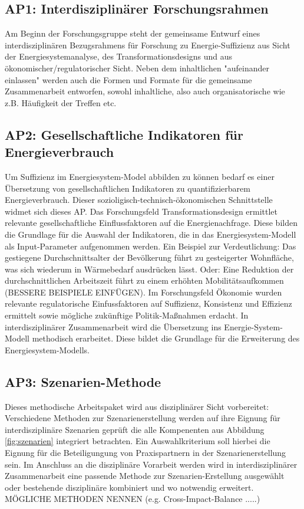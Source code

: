 \documentclass[a4paper,11pt,twoside]{scrartcl}
\begin{document}
\subsection*{AP1: Interdisziplinärer Forschungsrahmen}
Am Beginn der Forschungsgruppe steht der gemeinsame Entwurf eines interdisziplinären Bezugsrahmens für Forschung zu Energie-Suffizienz aus Sicht der Energiesystemanalyse, des Transformationsdesigns und aus ökonomischer/regulatorischer Sicht. Neben dem inhaltlichen "aufeinander einlassen" werden auch die Formen und Formate für die gemeinsame Zusammenarbeit entworfen, sowohl inhaltliche, also auch organisatorische wie z.B. Häufigkeit der Treffen etc.

\subsection*{AP2: Gesellschaftliche Indikatoren für Energieverbrauch}
Um Suffizienz im Energiesystem-Model abbilden zu können bedarf es einer Übersetzung von gesellschaftlichen Indikatoren zu quantifizierbarem Energieverbrauch. Dieser sozioligisch-technisch-ökonomischen Schnittstelle widmet sich dieses AP. Das Forschungsfeld Transformationsdesign ermittlet relevante gesellschaftliche Einflussfaktoren auf die Energienachfrage. Diese bilden die Grundlage für die Auswahl der Indikatoren, die in das Energiesystem-Modell als Input-Parameter aufgenommen werden. Ein Beispiel zur Verdeutlichung: Das gestiegene Durchschnittsalter der Bevölkerung führt zu gesteigerter Wohnfläche, was sich wiederum in Wärmebedarf ausdrücken lässt. Oder: Eine Reduktion der durchschnittlichen Arbeitszeit führt zu einem erhöhten Mobilitätsaufkommen (BESSERE BEISPIELE EINFÜGEN). Im Forschungsfeld Ökonomie wurden relevante regulatorische Einfussfaktoren auf Suffizienz, Konsistenz und Effizienz ermittelt sowie mögliche zukünftige Politik-Maßnahmen erdacht. In interdisziplinärer Zusammenarbeit wird die Übersetzung ins Energie-System-Modell methodisch erarbeitet. Diese bildet die Grundlage für die Erweiterung des Energiesystem-Modells.

\subsection*{AP3: Szenarien-Methode}
Dieses methodische Arbeitspaket wird aus disziplinärer Sicht vorbereitet: Verschiedene Methoden zur Szenarienerstellung werden auf ihre Eignung für interdisziplinäre Szenarien geprüft die alle Kompenenten aus Abbildung \ref{fig:szenarien} integriert betrachten. Ein Auswahlkriterium soll hierbei die Eignung für die Beteiligungung von Praxispartnern in der Szenarienerstellung sein. Im Anschluss an die disziplinäre Vorarbeit werden wird in interdisziplinärer Zusammenarbeit eine passende Methode zur Szenarien-Erstellung ausgewählt oder bestehende disziplinäre kombiniert und wo notwendig erweitert. MÖGLICHE METHODEN NENNEN (e.g. Cross-Impact-Balance .....)
\end{document}
